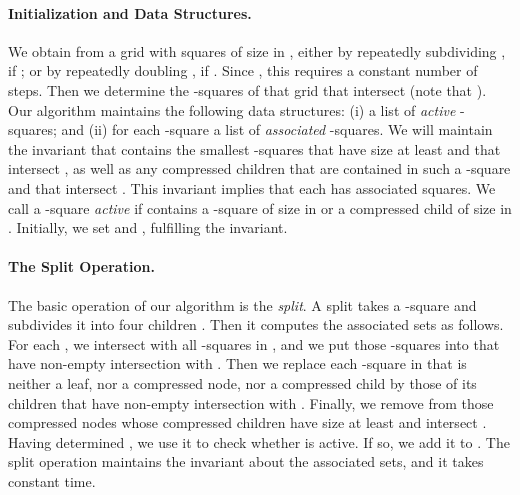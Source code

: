 \documentclass[11pt]{paper}
\begin{document}
   \paragraph{Initialization and Data Structures.}
      We obtain from   a grid with squares of size in
       , either by repeatedly subdividing 
      , if ; or by repeatedly doubling ,
      if . Since , this requires a constant
      number of steps. Then we determine
      the -squares  of that grid that intersect  
      (note that ). Our algorithm maintains the 
      following data structures:
      (i) a list  of \emph{active} -squares; and (ii) for each 
      -square  a list  of \emph{associated} -squares. 
      We will maintain the invariant that  contains the smallest 
      -squares that have size at least   and that intersect , as
      well as any compressed children that are contained in such a
      -square and that intersect . This invariant implies
      that each  has  associated squares. We call
      a -square  \emph{active} if 
       contains a -square
      of size in  or a compressed child of size in 
      . 
      Initially, we set  
      and ,
      fulfilling the invariant.
  
    \paragraph{The Split Operation.}
      The basic operation of our algorithm is the \emph{split}.
      A split takes a -square  and subdivides it into
      four children . Then it computes
      the associated sets  as follows.
      For each , we intersect 
       with all -squares in , and we put those -squares 
      into  that have non-empty intersection with .
      Then we replace each -square in  that is neither a 
      leaf, nor a compressed node, nor a compressed child by those of its
      children that have non-empty intersection with . Finally, we remove
      from  those compressed nodes whose compressed children have
      size at least  and intersect . Having determined
      , we use it to check whether  is active. If so, we add 
      it to . The split operation maintains the invariant
      about the associated sets, and it takes constant time.
      
\end{document}
